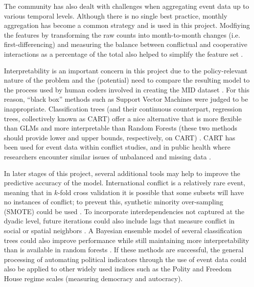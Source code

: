 \documentclass[12pt,letterpaper]{article}
\begin{document}
The community has also dealt with challenges when aggregating event data up to various temporal levels. Although there is no single best practice, monthly aggregation has become a common strategy \citep{arva2013improving,yonamine2013event} and is used in this project. Modfiying the features by transforming the raw counts into month-to-month changes (i.e. first-differencing) and measuring the balance between conflictual and cooperative interactions as a percentage of the total also helped to simplify the feature set \citep{Box:1976}. 

Interpretability is an important concern in this project due to the policy-relevant nature of the problem and the (potential) need to compare the resulting model to the process used by human coders involved in creating the MID dataset \citep{ghosn2004mid3}. For this reason, ``black box'' methods such as Support Vector Machines were judged to be inappropriate. Classification trees (and their continuous counterpart, regression trees, collectively known as CART) offer a nice alternative that is more flexible than GLMs and more interpretable than Random Forests (these two methods should provide lower and upper bounds, respectively, on CART) \citep{klebanov2008lexical}. CART has been used for event data within conflict studies, and in public health where researchers encounter similar issues of unbalanced and missing data \citep{schrodt1990predicting,speybroeck2012classification,trappl1996digging}.

In later stages of this project, several additional tools may help to improve the predictive accuracy of the model. International conflict is a relatively rare event, meaning that in $k$-fold cross validation it is possible that some subsets will have no instances of conflict; to prevent this, synthetic minority over-sampling (SMOTE) could be used \citep{chawla2002smote}. To incorporate interdependencies not captured at the dyadic level, future iterations could also include lags that measure conflict in social or spatial neighbors \citep{gleditsch2000war,gleditsch2001measuring,hoff2004modeling,ward1998democratizing,ward2007disputes,ward2011network}. A Bayesian ensemble model of several classification trees could also improve performance while still maintaining more interpretability than is available in random forests \citep{arva2013improving,montgomery2012improving,Raftery:1995,raftery2005using}. If these methods are successful, the general processing of automating political indicators through the use of event data could also be applied to other widely used indices such as the Polity and Freedom House regime scales (measuring democracy and autocracy). 
\end{document}
